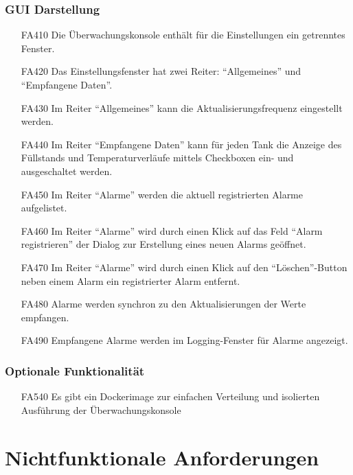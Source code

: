 \documentclass[parskip=full]{scrartcl}
\begin{document}
\subsubsection{GUI Darstellung}
\begin{enumerate}
\item[FA410] Die Überwachungskonsole enthält für die Einstellungen ein getrenntes Fenster.
\item[FA420] Das Einstellungsfenster hat zwei Reiter: ``Allgemeines'' und ``Empfangene Daten''.
\item[FA430] Im Reiter ``Allgemeines'' kann die Aktualisierungsfrequenz eingestellt werden.
\item[FA440] Im Reiter ``Empfangene Daten'' kann für jeden Tank die Anzeige des Füllstands und Temperaturverläufe mittels Checkboxen ein- und ausgeschaltet werden.
\item[FA450] Im Reiter ``Alarme'' werden die aktuell registrierten Alarme aufgelistet.
\item[FA460] Im Reiter ``Alarme'' wird durch einen Klick auf das Feld ``Alarm registrieren'' der Dialog zur Erstellung eines
  neuen Alarms ge\"offnet.
\item[FA470] Im Reiter ``Alarme'' wird durch einen Klick auf den ``L\"oschen''-Button neben einem Alarm ein registrierter Alarm entfernt.
\item[FA480] Alarme werden synchron zu den Aktualisierungen der Werte empfangen.
\item[FA490] Empfangene Alarme werden im Logging-Fenster f\"ur Alarme angezeigt.
\end{enumerate}

\subsubsection{Optionale Funktionalität}
\label{konsole-optional}
\begin{enumerate}
\item[FA540] Es gibt ein Dockerimage zur einfachen Verteilung und isolierten Ausführung der Überwachungskonsole
\end{enumerate}

\section{Nichtfunktionale Anforderungen}
\end{document}
